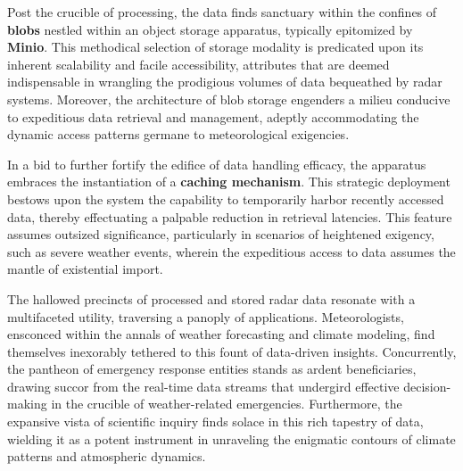 Post the crucible of processing, the data finds sanctuary within the confines of
\textbf{blobs} nestled within an object storage apparatus, typically epitomized
by \textbf{Minio}. This methodical selection of storage modality is predicated
upon its inherent scalability and facile accessibility, attributes that are
deemed indispensable in wrangling the prodigious volumes of data bequeathed by
radar systems. Moreover, the architecture of blob storage engenders a milieu
conducive to expeditious data retrieval and management, adeptly accommodating
the dynamic access patterns germane to meteorological exigencies.

In a bid to further fortify the edifice of data handling efficacy, the apparatus
embraces the instantiation of a \textbf{caching mechanism}. This strategic
deployment bestows upon the system the capability to temporarily harbor recently
accessed data, thereby effectuating a palpable reduction in retrieval latencies.
This feature assumes outsized significance, particularly in scenarios of
heightened exigency, such as severe weather events, wherein the expeditious
access to data assumes the mantle of existential import.

The hallowed precincts of processed and stored radar data resonate with a
multifaceted utility, traversing a panoply of applications. Meteorologists,
ensconced within the annals of weather forecasting and climate modeling, find
themselves inexorably tethered to this fount of data-driven insights.
Concurrently, the pantheon of emergency response entities stands as ardent
beneficiaries, drawing succor from the real-time data streams that undergird
effective decision-making in the crucible of weather-related emergencies.
Furthermore, the expansive vista of scientific inquiry finds solace in this rich
tapestry of data, wielding it as a potent instrument in unraveling the enigmatic
contours of climate patterns and atmospheric dynamics.
